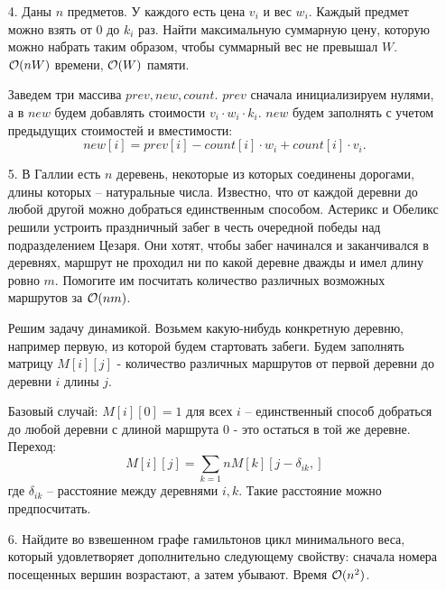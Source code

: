 \begin{enumerate}
  \item[4.]
    Даны $n$ предметов. У каждого есть цена $v_i$ и вес $w_i$. Каждый предмет можно взять
    от $0$ до $k_i$ раз. Найти максимальную суммарную цену,
    которую можно набрать таким образом, чтобы суммарный вес не превышал $W$.
    $\mathcal{O}(nW)$ времени, $\mathcal{O}(W)$ памяти.
    \begin{solution}
      Заведем три массива $prev, new, count$. $prev$ сначала инициализируем нулями, а в $new$ будем добавлять стоимости $v_i\cdot w_i \cdot k_i$. $new$ будем заполнять с учетом предыдущих стоимостей и вместимости:
      \begin{equation}
        new[i] = prev[i] - count[i] \cdot w_i + count[i] \cdot v_i.
      \end{equation}
    \end{solution}

  \item[5.] 
    В Галлии есть $n$ деревень, некоторые из которых соединены дорогами, длины которых --
    натуральные числа. Известно, что от каждой деревни до любой другой можно добраться
    единственным способом. Астерикс и Обеликс решили устроить праздничный забег в честь
    очередной победы над подразделением Цезаря. Они хотят, чтобы забег начинался и заканчивался
    в деревнях, маршрут не проходил ни по какой деревне дважды и имел длину ровно $m$.
    Помогите им посчитать количество различных возможных маршрутов за $\mathcal{O}(nm)$.
    \begin{solution}
      Решим задачу динамикой. Возьмем какую-нибудь конкретную деревню, например первую, из которой будем стартовать забеги. Будем заполнять матрицу $M[i][j]$ - количество различных маршрутов от первой деревни до деревни $i$ длины $j$.

      Базовый случай: $M[i][0]=1$ для всех $i$ -- единственный способ добраться до любой деревни с длиной маршрута 0 - это остаться в той же деревне.
      Переход:
      \begin{equation}
        M[i][j] = \sum_{k=1}{n} M[k][j-\delta_{ik},]
      \end{equation}
      где $\delta_{ik}$ -- расстояние между деревнями $i, k$. Такие расстояние можно предпосчитать.
    \end{solution}

  \item[6.]
    Найдите во взвешенном графе гамильтонов цикл
    минимального веса, который удовлетворяет дополнительно следующему свойству: сначала
    номера посещенных вершин возрастают, а затем убывают. Время $\mathcal{O}(n^2)$.


\end{enumerate}
